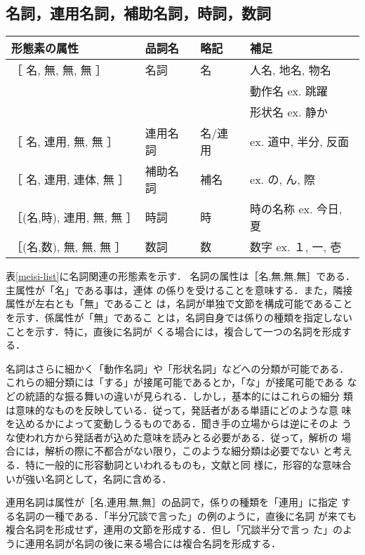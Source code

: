 \subsection{名詞，連用名詞，補助名詞，時詞，数詞}
\begin{table*}
\begin{center}
\begin{tabular}{|l|l|l|l|}
\hline
形態素の属性 & 品詞名 & 略記 & 補足 \\
\hline
［ 名, 無, 無, 無 ］& 名詞 & 名 & 人名, 地名, 物名 \\
			&&	& 動作名 ex. 跳躍 \\
			&&	& 形状名 ex. 静か \\
［ 名, 連用, 無, 無 ］	& 連用名詞 & 名/連用 & ex. 道中, 半分, 反面 \\
［ 名, 連用, 連体, 無 ］& 補助名詞 & 補名 & ex. の, ん, 際 \\
［(名,時), 連用, 無, 無 ］& 時詞   & 時      & 時の名称 ex. 今日, 夏 \\
［(名,数), 無, 無, 無 ］& 数詞     & 数      & 数字 ex. １, 一, 壱 \\
\hline
\end{tabular}
\end{center}
\caption{名詞，数詞，時詞，補助名詞}
\label{meisi-list}
\end{table*}

表\ref{meisi-list}に名詞関連の形態素を示す．
名詞の属性は［名,無,無,無］である．主属性が「名」である事は，連体
の係りを受けることを意味する．また，隣接属性が左右とも「無」であること
は，名詞が単独で文節を構成可能であることを示す．係属性が「無」であるこ
とは，名詞自身では係りの種類を指定しないことを示す．特に，直後に名詞が
くる場合には，複合して一つの名詞を形成する．

名詞はさらに細かく「動作名詞」や「形状名詞」などへの分類が可能である．
これらの細分類には「する」が接尾可能であるとか，「な」が接尾可能である
などの統語的な振る舞いの違いが見られる．しかし，基本的にはこれらの細分
類は意味的なものを反映している．従って，発話者がある単語にどのような意
味を込めるかによって変動しうるものである．聞き手の立場からは逆にそのよ
うな使われ方から発話者が込めた意味を読みとる必要がある．従って，解析の
場合には，解析の際に不都合がない限り，このような細分類は必要でない
と考える．特に一般的に形容動詞といわれるものも，文献\cite{tokieda}と同
様に，形容的な意味合いが強い名詞として，名詞に含める．

連用名詞は属性が［名,連用,無,無］の品詞で，係りの種類を「連用」に指定
する名詞の一種である．「半分冗談で言った」の例のように，直後に名詞
が来ても複合名詞を形成せず，連用の文節を形成する．但し「冗談半分で言っ
た」のように連用名詞が名詞の後に来る場合には複合名詞を形成する．

